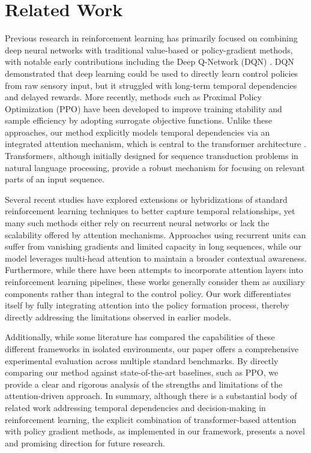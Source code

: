 \documentclass{article}
\begin{document}
\section{Related Work}
Previous research in reinforcement learning has primarily focused on combining deep neural networks with traditional value-based or policy-gradient methods, with notable early contributions including the Deep Q-Network (DQN) . DQN demonstrated that deep learning could be used to directly learn control policies from raw sensory input, but it struggled with long-term temporal dependencies and delayed rewards. More recently, methods such as Proximal Policy Optimization (PPO)  have been developed to improve training stability and sample efficiency by adopting surrogate objective functions. Unlike these approaches, our method explicitly models temporal dependencies via an integrated attention mechanism, which is central to the transformer architecture \cite{ashish_2017_attention}. Transformers, although initially designed for sequence transduction problems in natural language processing, provide a robust mechanism for focusing on relevant parts of an input sequence. 

Several recent studies have explored extensions or hybridizations of standard reinforcement learning techniques to better capture temporal relationships, yet many such methods either rely on recurrent neural networks or lack the scalability offered by attention mechanisms. Approaches using recurrent units can suffer from vanishing gradients and limited capacity in long sequences, while our model leverages multi-head attention to maintain a broader contextual awareness. Furthermore, while there have been attempts to incorporate attention layers into reinforcement learning pipelines, these works generally consider them as auxiliary components rather than integral to the control policy. Our work differentiates itself by fully integrating attention into the policy formation process, thereby directly addressing the limitations observed in earlier models.

Additionally, while some literature has compared the capabilities of these different frameworks in isolated environments, our paper offers a comprehensive experimental evaluation across multiple standard benchmarks. By directly comparing our method against state-of-the-art baselines, such as PPO, we provide a clear and rigorous analysis of the strengths and limitations of the attention-driven approach. In summary, although there is a substantial body of related work addressing temporal dependencies and decision-making in reinforcement learning, the explicit combination of transformer-based attention with policy gradient methods, as implemented in our framework, presents a novel and promising direction for future research.
\end{document}
